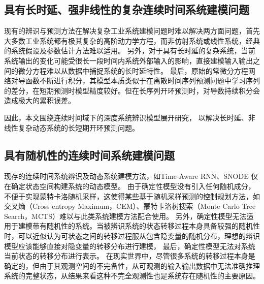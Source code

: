 \subsection{具有长时延、强非线性的复杂连续时间系统建模问题}
现有的辨识与预测方法在解决复杂工业系统建模问题时难以解决两方面问题，首先大多数工业系统都有极其复杂的高阶动力学方程，而非仿射系统或线性系统，经典的系统假设及参数估计方法难以适用。
另外，对于具有长时延的复杂系统，当前系统输出的变化可能受很长一段时间内系统外部输入的影响，直接建模输入输出之间的微分方程难以从数据中捕捉系统的长时延特性。
最后，原始的常微分方程网络对导函数不断进行积分，其模型本质类似于在离散时间序列预测问题中学习序列的差分，在短期预测时模型精度较好。但在长序列开环预测时，对导数持续积分会造成极大的累积误差。

因此，本文围绕连续时间域下的深度系统辨识模型展开研究，
以解决长时延、非线性复杂动态系统的长短期开环预测问题。



\subsection{具有随机性的连续时间系统建模问题}
现存的连续时间系统辨识及动态系统建模方法，如Time-Aware RNN\cite{Demeester2019}、SNODE\cite{Quaglino2019} 仅在确定状态空间构建系统的动态模型。
由于确定性模型没有引入任何随机成分，不便于实现蒙特卡洛随机采样，这使得某些基于随机采样预测的控制规划方法，如交叉熵（Cross entropy Maximum，CEM）、蒙特卡洛树搜索（Monte Carlo Tree Search，MCTS）难以与此类系统建模方法配合使用。
另外，确定性模型无法适用于建模带有随机性的系统。当被辨识系统的状态转移过程本身具备较强的随机性时，可以近似认为可状态之间的转移过程服从包含隐变量的随机分布，理想的辩识模型应该能够直接对隐变量的转移分布进行建模，
最后，确定性模型无法对系统当前状态的转移分布进行表示。
在现实世界中，尽管很多系统的转移过程本身是确定的，但由于其观测空间的不完备性，从可观测的输入输出数据中无法准确推理系统的完整状态，从结果来看这种不完全观测性也是系统存在随机性的主要原因。

